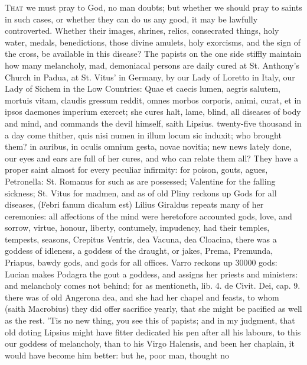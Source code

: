 {\lettrine{T}{hat} we must pray to God, no man doubts; but whether we should pray to
saints in such cases, or whether they can do us any good, it may be
lawfully controverted. Whether their images, shrines, relics,
consecrated things, holy water, medals, benedictions, those divine
amulets, holy exorcisms, and the sign of the cross, be available in
this disease? The papists on the one side stiffly maintain how many
melancholy, mad, demoniacal persons are daily cured at St. Anthony's
Church in Padua, at St. Vitus' in Germany, by our Lady of Loretto in
Italy, our Lady of Sichem in the Low Countries: Quae et caecis
lumen, aegris salutem, mortuis vitam, claudis gressum reddit, omnes
morbos corporis, animi, curat, et in ipsos daemones imperium exercet;
she cures halt, lame, blind, all diseases of body and mind, and
commands the devil himself, saith Lipsius. twenty-five thousand in a
day come thither, quis nisi numen in illum locum sic induxit; who
brought them? in auribus, in oculis omnium gesta, novae novitia; new
news lately done, our eyes and ears are full of her cures, and who can
relate them all? They have a proper saint almost for every peculiar
infirmity: for poison, gouts, agues, Petronella: St. Romanus for such
as are possessed; Valentine for the falling sickness; St. Vitus for
madmen, \etc{} and as of old Pliny reckons up Gods for all diseases,
(Febri fanum dicalum est) Lilius Giraldus repeats many of her
ceremonies: all affections of the mind were heretofore accounted gods,
love, and sorrow, virtue, honour, liberty, contumely, impudency,
had their temples, tempests, seasons, Crepitus Ventris, dea Vacuna, dea
Cloacina, there was a goddess of idleness, a goddess of the draught, or
jakes, Prema, Premunda, Priapus, bawdy gods, and gods for all 
offices. Varro reckons up 30\thinspace{}000 gods: Lucian makes Podagra the gout a
goddess, and assigns her priests and ministers: and melancholy comes
not behind; for as \Austin{} mentioneth, lib. 4. de Civit. Dei, cap. 9.
there was of old Angerona dea, and she had her chapel and feasts, to
whom (saith Macrobius) they did offer sacrifice yearly, that she
might be pacified as well as the rest. 'Tis no new thing, you see this
of papists; and in my judgment, that old doting Lipsius might have
fitter dedicated his pen after all his labours, to this our
goddess of melancholy, than to his Virgo Halensis, and been her
chaplain, it would have become him better: but he, poor man, thought no
}
